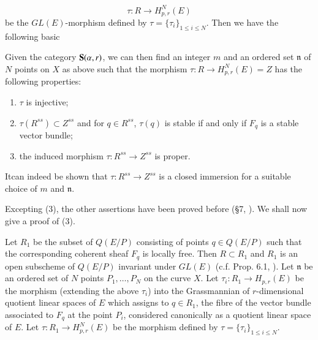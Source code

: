 $$
\tau : R\to H^{N}_{p,r}(E)
$$
be the $GL(E)$-morphism defined by $\tau=\{\tau_{i}\}_{1\leq i\leq N}$. Then we have the following basic

\begin{lemma}\label{art18-lem2}
Given the category $\mathbf{S}(\alpha,r)$, we can then find an integer $m$ and an ordered set $\mathfrak{n}$ of $N$ points on $X$ as above such that the morphism $\tau:R\to H^{N}_{p,r}(E)=Z$ has the following properties:
\begin{enumerate}
\renewcommand{\labelenumi}{\rm(\theenumi)}
\item $\tau$ is injective;

\item $\tau(R^{ss})\subset Z^{ss}$ and for $q\in R^{ss}$, $\tau(q)$ is stable if and only if $F_{q}$ is a stable vector bundle;

\item the induced morphism $\tau :R^{ss}\to Z^{ss}$ is proper.
\end{enumerate}
\end{lemma}

\begin{remark*}
It\pageoriginale can indeed be shown that $\tau :R^{ss}\to Z^{ss}$ is a closed immersion for a suitable choice of $m$ and $\mathfrak{n}$.
\end{remark*}

Excepting (3), the other assertions have been proved before (\S7, \cite{art18-key12}). We shall now give a proof of (3).

Let $R_{1}$ be the subset of $Q(E/P)$ consisting of points $q\in Q(E/P)$ such that the corresponding coherent sheaf $F_{q}$ is locally free. Then $R\subset R_{1}$ and $R_{1}$ is an open subscheme of $Q(E/P)$ invariant under $GL(E)$ (c.f. Prop. 6.1, \cite{art18-key12}). Let $\mathfrak{n}$ be an ordered set of $N$ points $P_{1},\ldots,P_{N}$ on the curve $X$. Let $\tau_{i}:R_{1}\to H_{p,r}(E)$ be the morphism (extending the above $\tau_{i}$) into the Grassmannian of $r$-dimensional quotient linear spaces of $E$ which assigns to $q\in R_{1}$, the fibre of the vector bundle associated to $F_{q}$ at the point $P_{i}$, considered canonically as a quotient linear space of $E$. Let $\tau:R_{1}\to H^{N}_{p,r}(E)$ be the morphism defined by $\tau=\{\tau_{i}\}_{1\leq i\leq N}$.

